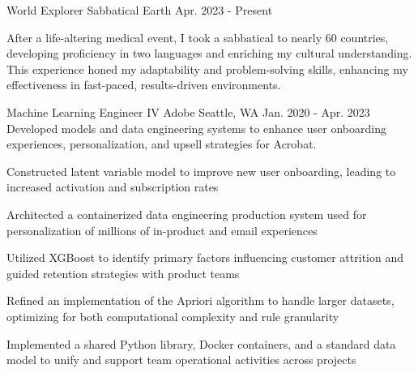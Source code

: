
%
% 
% 
%
%
%
%
%
% 

\begin{cventries}

\cventry
    {World Explorer} %
    {Sabbatical} %
    {Earth} %
    {Apr. 2023 - Present} %
    {\parbox[t]{\linewidth}{After a life-altering medical event, I took a sabbatical to nearly 60 countries, developing proficiency in two languages and enriching my cultural understanding. This experience honed my adaptability and problem-solving skills, enhancing my effectiveness in fast-paced, results-driven environments.}} %
    {}

\cventry
    {Machine Learning Engineer IV} %
    {Adobe} %
    {Seattle, WA} %
    {Jan. 2020 - Apr. 2023} %
    {Developed models and data engineering systems to enhance user onboarding experiences, personalization, and upsell strategies for Acrobat.} %
    {
      \begin{cvitems} %
        \item {Constructed latent variable model to improve new user onboarding, leading to increased activation and subscription rates}
        \item {Architected a containerized data engineering production system used for personalization of millions of in-product and email experiences}
        \item {Utilized XGBoost to identify primary factors influencing customer attrition and guided retention strategies with product teams}
        \item {Refined an implementation of the Apriori algorithm to handle larger datasets, optimizing for both computational complexity and rule granularity}
        \item {Implemented a shared Python library, Docker containers, and a standard data model to unify and support team operational activities across projects}
      \end{cvitems}
    }


\end{cventries}
